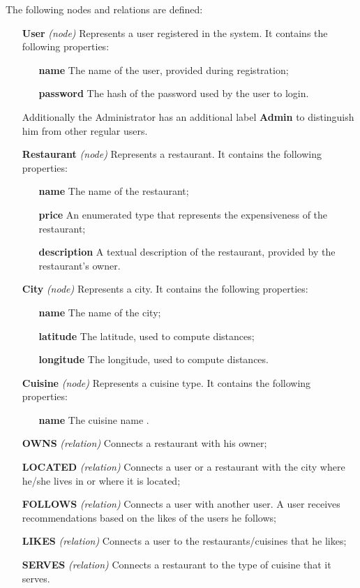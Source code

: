 The following nodes and relations are defined:
\begin{itemize}
	\item[\textbf{User}] \textit{(node)} Represents a user registered in the
		system. It contains the following properties:
		\begin{itemize}
			\item[\textbf{name}] The name of the user, provided
				during registration;
			\item[\textbf{password}] The hash of the password used
				by the user to login.
		\end{itemize}
		Additionally the Administrator has an additional label
		\textbf{Admin} to distinguish him from other regular users.
	\item[\textbf{Restaurant}] \textit{(node)} Represents a restaurant. It
		contains the following properties:
		\begin{itemize}
			\item[\textbf{name}] The name of the restaurant;
			\item[\textbf{price}] An enumerated type that represents
				the expensiveness of the restaurant;
			\item[\textbf{description}] A textual description of the
				restaurant, provided by the restaurant's owner.
		\end{itemize}
	\item[\textbf{City}] \textit{(node)} Represents a city. It contains the
		following properties:
		\begin{itemize}
			\item[\textbf{name}] The name of the city;
			\item[\textbf{latitude}] The latitude, used to compute
				distances;
			\item[\textbf{longitude}] The longitude, used to compute
				distances.
		\end{itemize}
	\item[\textbf{Cuisine}] \textit{(node)} Represents a cuisine type. It
		contains the following properties:
		\begin{itemize}
			\item[\textbf{name}] The cuisine name .
		\end{itemize}
	\item[\textbf{OWNS}] \textit{(relation)} Connects a restaurant with his
		owner;
	\item[\textbf{LOCATED}] \textit{(relation)} Connects a user or a
		restaurant with the city where he/she lives in or where it is
		located;
	\item[\textbf{FOLLOWS}] \textit{(relation)} Connects a user with another
		user. A user receives recommendations based on the likes of the
		users he follows;
	\item[\textbf{LIKES}] \textit{(relation)} Connects a user to the
		restaurants/cuisines that he likes;
	\item[\textbf{SERVES}] \textit{(relation)} Connects a restaurant to the
		type of cuisine that it serves.
\end{itemize}

